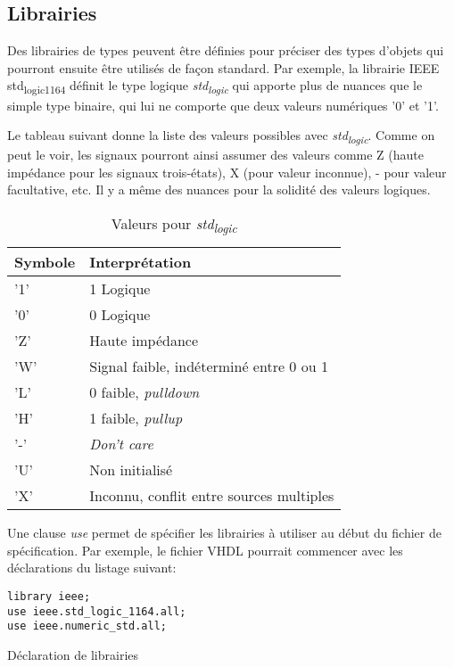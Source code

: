 \documentclass[11pt]{article}
\begin{document}
\subsection{Librairies}
\label{sec:org93e84a8}

Des librairies de types peuvent être définies pour préciser des types
d'objets qui pourront ensuite être utilisés de façon standard. Par
exemple, la librairie IEEE std\textsubscript{logic}\textsubscript{1164} définit le type logique
\emph{std\textsubscript{logic}} qui apporte plus de nuances que le simple type binaire,
qui lui ne comporte que deux valeurs numériques '0' et '1'.

Le tableau suivant donne la liste des valeurs possibles avec
\emph{std\textsubscript{logic}}. Comme on peut le voir, les signaux pourront ainsi assumer
des valeurs comme Z (haute impédance pour les signaux trois-états), X
(pour valeur inconnue), - pour valeur facultative, etc. Il y a même
des nuances pour la solidité des valeurs logiques.

\begin{table}[htbp]
\caption{\label{tab:org27cecb3}Valeurs pour \emph{std\textsubscript{logic}}}
\centering
\begin{tabular}{ll}
Symbole & Interprétation\\[0pt]
\hline
'1' & 1 Logique\\[0pt]
'0' & 0 Logique\\[0pt]
'Z' & Haute impédance\\[0pt]
'W' & Signal faible, indéterminé entre 0 ou 1\\[0pt]
'L' & 0 faible, \emph{pulldown}\\[0pt]
'H' & 1 faible, \emph{pullup}\\[0pt]
'-' & \emph{Don't care}\\[0pt]
'U' & Non initialisé\\[0pt]
'X' & Inconnu, conflit entre sources multiples\\[0pt]
\end{tabular}
\end{table}

Une clause \emph{use} permet de spécifier les librairies à utiliser au
début du fichier de spécification. Par exemple, le fichier VHDL
pourrait commencer avec les déclarations du listage suivant:

\begin{listing}[htbp]
\begin{verbatim}
library ieee;
use ieee.std_logic_1164.all;
use ieee.numeric_std.all;
\end{verbatim}
\caption{Déclaration de librairies}
\end{listing}
\end{document}
